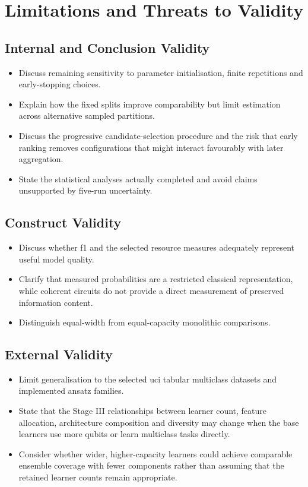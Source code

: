 \documentclass[]{UCD_CS_MSc_AAI_Report}
\begin{document}
\section{Limitations and Threats to Validity}
\label{sec:discussion-limitations}

\subsection{Internal and Conclusion Validity}
\begin{itemize}
    \item Discuss remaining sensitivity to parameter initialisation, finite repetitions and early-stopping choices.
    \item Explain how the fixed splits improve comparability but limit estimation across alternative sampled partitions.
    \item Discuss the progressive candidate-selection procedure and the risk that early ranking removes configurations that might interact favourably with later aggregation.
    \item State the statistical analyses actually completed and avoid claims unsupported by five-run uncertainty.
\end{itemize}

\subsection{Construct Validity}
\begin{itemize}
    \item Discuss whether \acl{f1} and the selected resource measures adequately represent useful model quality.
    \item Clarify that measured probabilities are a restricted classical representation, while coherent circuits do not provide a direct measurement of preserved information content.
    \item Distinguish equal-width from equal-capacity monolithic comparisons.
\end{itemize}

\subsection{External Validity}
\begin{itemize}
    \item Limit generalisation to the selected \ac{uci} tabular multiclass datasets and implemented ansatz families.
    \item State that the Stage III relationships between learner count, feature allocation, architecture composition and diversity may change when the base learners use more qubits or learn multiclass tasks directly.
    \item Consider whether wider, higher-capacity learners could achieve comparable ensemble coverage with fewer components rather than assuming that the retained learner counts remain appropriate.
\end{itemize}
\end{document}
